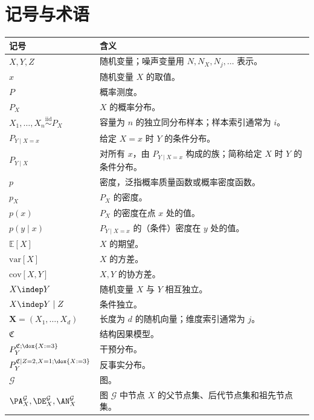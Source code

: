\chapter*{记号与术语}
\begingroup
\small
\setlength{\LTpre}{0pt}
\begin{longtable}{@{}p{}p{}@{}}
\toprule
记号 & 含义 \\
\midrule
\endhead
$X,Y,Z$ & 随机变量；噪声变量用 $N,N_X,N_j,\ldots$ 表示。 \\
$x$ & 随机变量 $X$ 的取值。 \\
$P$ & 概率测度。 \\
$P_X$ & $X$ 的概率分布。 \\
$X_1,\ldots,X_n\overset{\mathrm{iid}}{\sim}P_X$ & 容量为 $n$ 的独立同分布样本；样本索引通常为 $i$。 \\
$P_{Y\mid X=x}$ & 给定 $X=x$ 时 $Y$ 的条件分布。 \\
$P_{Y\mid X}$ & 对所有 $x$，由 $P_{Y\mid X=x}$ 构成的族；简称给定 $X$ 时 $Y$ 的条件分布。 \\
$p$ & 密度，泛指概率质量函数或概率密度函数。 \\
$p_X$ & $P_X$ 的密度。 \\
$p(x)$ & $P_X$ 的密度在点 $x$ 处的值。 \\
$p(y\mid x)$ & $P_{Y\mid X=x}$ 的（条件）密度在 $y$ 处的值。 \\
$\mathbb E[X]$ & $X$ 的期望。 \\
$\mathrm{var}[X]$ & $X$ 的方差。 \\
$\mathrm{cov}[X,Y]$ & $X,Y$ 的协方差。 \\
$X\indep Y$ & 随机变量 $X$ 与 $Y$ 相互独立。 \\
$X\indep Y\mid Z$ & 条件独立。 \\
$\mathbf X=(X_1,\ldots,X_d)$ & 长度为 $d$ 的随机向量；维度索引通常为 $j$。 \\
$\mathfrak C$ & 结构因果模型。 \\
$P_Y^{\mathfrak C;\dox{X:=3}}$ & 干预分布。 \\
$P_Y^{\mathfrak C\mid Z=2,X=1;\dox{X:=3}}$ & 反事实分布。 \\
$\mathcal G$ & 图。 \\
$\PA_X^{\mathcal G},\DE_X^{\mathcal G},\AN_X^{\mathcal G}$ & 图 $\mathcal G$ 中节点 $X$ 的父节点集、后代节点集和祖先节点集。 \\
\bottomrule
\end{longtable}
\endgroup
